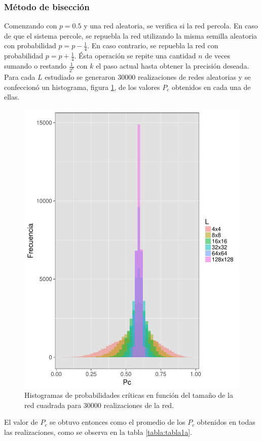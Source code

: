 \documentclass[%
 reprint,
 amsmath,amssymb,
 aps,
spanish]{revtex4-1}
\begin{document}
\subsubsection{Método de bisección}
Comenzando con $p = 0.5$ y una red aleatoria, se verifica si la red percola. En caso de que el sistema percole, se repuebla la red utilizando la misma semilla aleatoria con probabilidad $p = p-\frac{1}{4}$. En caso contrario, se repuebla la red con probabilidad $p = p+\frac{1}{4}$. Ésta operación se repite una cantidad $n$ de veces sumando o restando $\frac{1}{2^k}$ con $k$ el paso actual hasta obtener la precisión deseada.
Para cada $L$ estudiado se generaron $30000$ realizaciones de redes aleatorias y se confeccionó un histograma, figura \ref{fig:histograma1a}, de los valores $P_c$ obtenidos en cada una de ellas.
\begin{figure}[h!]
  \centering
  \includegraphics[width=.95\linewidth]{ej1a/histograma}
\caption{Histogramas de probabilidades críticas en función del tamaño de la red cuadrada para 30000 realizaciones de la red.}
\label{fig:histograma1a}
\end{figure}
El valor de $P_c$ se obtuvo entonces como el promedio de los $P_c$ obtenidos en todas las realizaciones, como se observa en la tabla \ref{tabla:tabla1a}.
\end{document}
